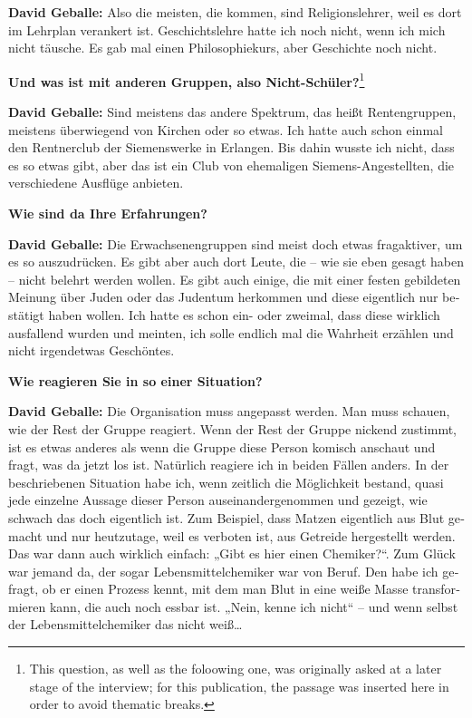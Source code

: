 \begin{otherlanguage}{ngerman}
\textbf{David Geballe:} Also die meisten, die kommen, sind Religionslehrer, weil es dort im Lehrplan verankert ist. Geschichtslehre hatte ich noch nicht, wenn ich mich nicht täusche. Es gab mal einen Philosophiekurs, aber Geschichte noch nicht. 

\textbf{Und was ist mit anderen Gruppen, also Nicht-Schüler?}\footnote{This question, as well as the foloowing one, was originally asked at a later stage of the interview; for this publication, the passage was inserted here in order to avoid thematic breaks.} 

\textbf{David Geballe:} Sind meistens das andere Spektrum, das heißt Rentengruppen, meistens überwiegend von Kirchen oder so etwas. Ich hatte auch schon einmal den Rentnerclub der Siemenswerke in Erlangen. Bis dahin wusste ich nicht, dass es so etwas gibt, aber das ist ein Club von ehemaligen Siemens-Angestellten, die verschiedene Ausflüge anbieten. 

\textbf{Wie sind da Ihre Erfahrungen?} 

\textbf{David Geballe:} Die Erwachsenengruppen sind meist doch etwas fragaktiver, um es so auszudrücken. Es gibt aber auch dort Leute, die – wie sie eben gesagt haben – nicht belehrt werden wollen. Es gibt auch einige, die mit einer festen gebildeten Meinung über Juden oder das Judentum herkommen und diese eigentlich nur bestätigt haben wollen. Ich hatte es schon ein- oder zweimal, dass diese wirklich ausfallend wurden und meinten, ich solle endlich mal die Wahrheit erzählen und nicht irgendetwas Geschöntes. 

\textbf{Wie reagieren Sie in so einer Situation?} 

\textbf{David Geballe:} Die Organisation muss angepasst werden. Man muss schauen, wie der Rest der Gruppe reagiert. Wenn der Rest der Gruppe nickend zustimmt, ist es etwas anderes als wenn die Gruppe diese Person komisch anschaut und fragt, was da jetzt los ist. Natürlich reagiere ich in beiden Fällen anders. 
In der beschriebenen Situation habe ich, wenn zeitlich die Möglichkeit bestand, quasi jede einzelne Aussage dieser Person auseinandergenommen und gezeigt, wie schwach das doch eigentlich ist. Zum Beispiel, dass Matzen eigentlich aus Blut gemacht und nur heutzutage, weil es verboten ist, aus Getreide hergestellt werden. Das war dann auch wirklich einfach: „Gibt es hier einen Chemiker?“. Zum Glück war jemand da, der sogar Lebensmittelchemiker war von Beruf. Den habe ich gefragt, ob er einen Prozess kennt, mit dem man Blut in eine weiße Masse transformieren kann, die auch noch essbar ist. „Nein, kenne ich nicht“ – und wenn selbst der Lebensmittelchemiker das nicht weiß… 


\end{otherlanguage}
